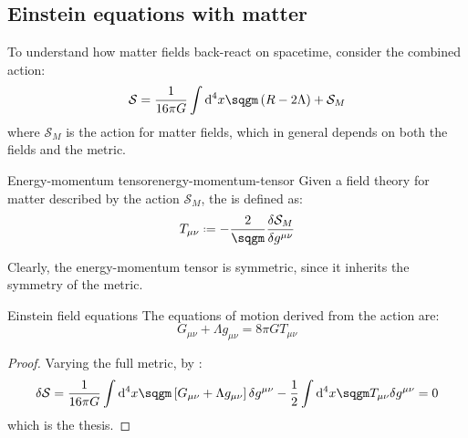 \subsection{Einstein equations with matter}

To understand how matter fields back-react on spacetime, consider the combined action:
\begin{equation}
  \mathcal{S} = \frac{1}{16\pi G} \int \dd^4 x \sqgm \left( R - 2 \Lambda \right) + \mathcal{S}_M
  \label{eq:ei-matter-action}
\end{equation}
where $ \mathcal{S}_M $ is the action for matter fields, which in general depends on both the fields and the metric.

\begin{definition}{Energy-momentum tensor}{energy-momentum-tensor}
  Given a field theory for matter described by the action $ \mathcal{S}_M $, the  is defined as:
  \begin{equation}
    T_{\mu \nu} \defeq - \frac{2}{\sqgm} \frac{\delta \mathcal{S}_M}{\delta g^{\mu \nu}}
    \label{eq:em-tens-def}
  \end{equation}
\end{definition}

Clearly, the energy-momentum tensor is symmetric, since it inherits the symmetry of the metric.

\begin{proposition}{Einstein field equations}{}
  The equations of motion derived from the action  are:
  \begin{equation}
    G_{\mu \nu} + \Lambda g_{\mu \nu} = 8\pi G T_{\mu \nu}
    \label{eq:ef-eq}
  \end{equation}
\end{proposition}

\begin{proofbox}
  \begin{proof}
    Varying the full metric, by :
    \begin{equation*}
      \delta \mathcal{S} = \frac{1}{16\pi G} \int \dd^4 x \sqgm \left[ G_{\mu \nu} + \Lambda g_{\mu \nu} \right] \delta g^{\mu \nu} - \frac{1}{2} \int \dd^4 x \sqgm T_{\mu \nu} \delta g^{\mu \nu} = 0
    \end{equation*}
    which is the thesis.
  \end{proof}
\end{proofbox}

